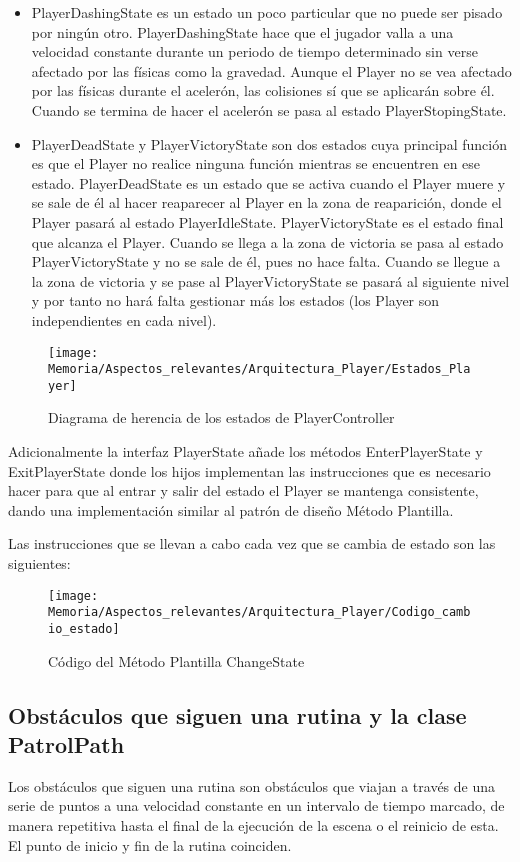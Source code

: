 \begin{itemize}
\item
PlayerDashingState es un estado un poco particular que no puede ser pisado por ningún otro. PlayerDashingState hace que el jugador valla a una velocidad constante durante un periodo de tiempo determinado sin verse afectado por las físicas como la gravedad. Aunque el Player no se vea afectado por las físicas durante el acelerón, las colisiones sí que se aplicarán sobre él. Cuando se termina de hacer el acelerón se pasa al estado PlayerStopingState.
\item
PlayerDeadState y PlayerVictoryState son dos estados cuya principal función es que el Player no realice ninguna función mientras se encuentren en ese estado. PlayerDeadState es un estado que se activa cuando el Player muere y se sale de él al hacer reaparecer al Player en la zona de reaparición, donde el Player pasará al estado PlayerIdleState. PlayerVictoryState es el estado final que alcanza el Player. Cuando se llega a la zona de victoria se pasa al estado PlayerVictoryState y no se sale de él, pues no hace falta. Cuando se llegue a la zona de victoria y se pase al PlayerVictoryState se pasará al siguiente nivel y por tanto no hará falta gestionar más los estados (los Player son independientes en cada nivel).
\end{itemize}

\begin{figure}[h]
\centering
\texttt{[image: Memoria/Aspectos\_relevantes/Arquitectura\_Player/Estados\_Player]}
\caption{Diagrama de herencia de los estados de PlayerController}
\end{figure}

Adicionalmente la interfaz PlayerState añade los métodos EnterPlayerState y ExitPlayerState donde los hijos implementan las instrucciones que es necesario hacer para que al entrar y salir del estado el Player se mantenga consistente, dando una implementación similar al patrón de diseño Método Plantilla.

\clearpage
Las instrucciones que se llevan a cabo cada vez que se cambia de estado son las siguientes:
\begin{figure}[h]
\centering
\texttt{[image: Memoria/Aspectos\_relevantes/Arquitectura\_Player/Codigo\_cambio\_estado]}
\caption{Código del Método Plantilla ChangeState}
\end{figure}

\subsection{Obstáculos que siguen una rutina y la clase PatrolPath}
Los obstáculos que siguen una rutina son obstáculos que viajan a través de una serie de puntos a una velocidad constante en un intervalo de tiempo marcado, de manera repetitiva hasta el final de la ejecución de la escena o el reinicio de esta. El punto de inicio y fin de la rutina coinciden. 

